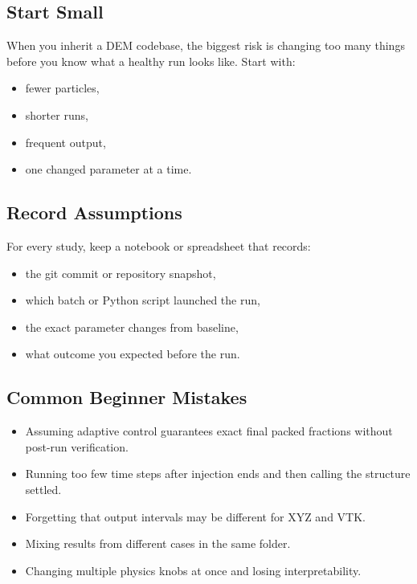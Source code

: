 \documentclass[11pt]{article}
\begin{document}
\subsection{Start Small}

When you inherit a DEM codebase, the biggest risk is changing too many things before you know what a healthy run looks like. Start with:
\begin{itemize}
  \item fewer particles,
  \item shorter runs,
  \item frequent output,
  \item one changed parameter at a time.
\end{itemize}

\subsection{Record Assumptions}

For every study, keep a notebook or spreadsheet that records:
\begin{itemize}
  \item the git commit or repository snapshot,
  \item which batch or Python script launched the run,
  \item the exact parameter changes from baseline,
  \item what outcome you expected before the run.
\end{itemize}

\subsection{Common Beginner Mistakes}

\begin{itemize}
  \item Assuming adaptive control guarantees exact final packed fractions without post-run verification.
  \item Running too few time steps after injection ends and then calling the structure settled.
  \item Forgetting that output intervals may be different for XYZ and VTK.
  \item Mixing results from different cases in the same folder.
  \item Changing multiple physics knobs at once and losing interpretability.
\end{itemize}
\end{document}
